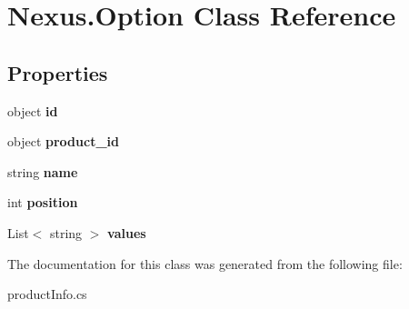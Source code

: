 \hypertarget{class_nexus_1_1_option}{}\section{Nexus.\+Option Class Reference}
\label{class_nexus_1_1_option}
\subsection*{Properties}
\begin{DoxyCompactItemize}
\item 
\mbox{\label{class_nexus_1_1_option_ae0907c6ad55185ebc42af11d4b04454a}} 
object {\bfseries id}
\item 
\mbox{\label{class_nexus_1_1_option_af474189e533b7a37aba9eb49ceac4f70}} 
object {\bfseries product\+\_\+id}
\item 
\mbox{\label{class_nexus_1_1_option_a178d51d868d75caf5d8e1f8c55e77cde}} 
string {\bfseries name}
\item 
\mbox{\label{class_nexus_1_1_option_a088fe308da91a34995ba552d66e5e8de}} 
int {\bfseries position}
\item 
\mbox{\label{class_nexus_1_1_option_aad3b82b623131b08c6d04b44caab2ef7}} 
List$<$ string $>$ {\bfseries values}
\end{DoxyCompactItemize}


The documentation for this class was generated from the following file\+:\begin{DoxyCompactItemize}
\item 
product\+Info.\+cs\end{DoxyCompactItemize}

